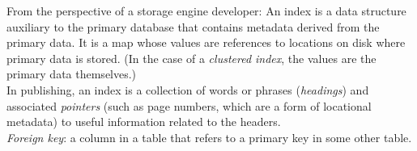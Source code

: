 \documentclass[12pt, titlepage]{article}
\begin{document}
From the perspective of a storage engine developer: An index is a data structure auxiliary to the primary database that contains metadata derived from the primary data. It is a map whose values are references to locations on disk where primary data is stored. (In the case of a \textit{clustered index}, the values are the primary data themselves.) \\

In publishing, an index is a collection of words or phrases (\textit{headings}) and associated \textit{pointers} (such as page numbers, which are a form of locational metadata) to useful information related to the headers. \\

\textit{Foreign key}: a column in a table that refers to a primary key in some other table.
\end{document}
